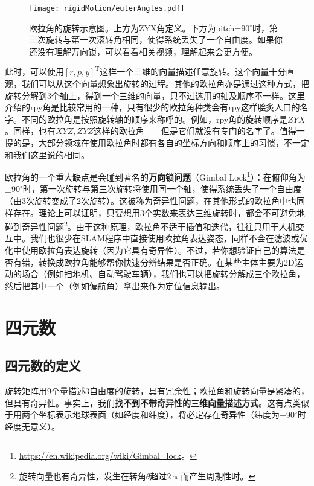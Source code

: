 \begin{figure}[!t]
	\centering
	\texttt{[image: rigidMotion/eulerAngles.pdf]}
	\caption{欧拉角的旋转示意图。上方为ZYX角定义。下方为pitch=$90^\circ$时，第三次旋转与第一次滚转角相同，使得系统丢失了一个自由度。如果你还没有理解万向锁，可以看看相关视频，理解起来会更方便。}
	\label{fig:eulerAngles}
\end{figure}

此时，可以使用$[r,p,y]^\mathrm{T}$这样一个三维的向量描述任意旋转。这个向量十分直观，我们可以从这个向量想象出旋转的过程。其他的欧拉角亦是通过这种方式，把旋转分解到3个轴上，得到一个三维的向量，只不过选用的轴及顺序不一样。这里介绍的rpy角是比较常用的一种，只有很少的欧拉角种类会有rpy这样脍炙人口的名字。不同的欧拉角是按照旋转轴的顺序来称呼的。例如，rpy角的旋转顺序是$ZYX$。同样，也有$XYZ, ZYZ$这样的欧拉角——但是它们就没有专门的名字了。值得一提的是，大部分领域在使用欧拉角时都有各自的坐标方向和顺序上的习惯，不一定和我们这里说的相同。

欧拉角的一个重大缺点是会碰到著名的\textbf{万向锁问题}（Gimbal Lock\footnote{\url{https://en.wikipedia.org/wiki/Gimbal_lock}。}）：在俯仰角为$\pm 90 ^\circ $时，第一次旋转与第三次旋转将使用同一个轴，使得系统丢失了一个自由度（由3次旋转变成了2次旋转）。这被称为奇异性问题，在其他形式的欧拉角中也同样存在。理论上可以证明，只要想用3个实数来表达三维旋转时，都会不可避免地碰到奇异性问题\footnote{旋转向量也有奇异性，发生在转角$\theta$超过$2\uppi$而产生周期性时。}。由于这种原理，欧拉角不适于插值和迭代，往往只用于人机交互中。我们也很少在SLAM程序中直接使用欧拉角表达姿态，同样不会在滤波或优化中使用欧拉角表达旋转（因为它具有奇异性）。不过，若你想验证自己的算法是否有错，转换成欧拉角能够帮你快速分辨结果是否正确。在某些主体主要为2D运动的场合（例如扫地机、自动驾驶车辆），我们也可以把旋转分解成三个欧拉角，然后把其中一个（例如偏航角）拿出来作为定位信息输出。

\section{四元数}
\subsection{四元数的定义}
旋转矩阵用9个量描述3自由度的旋转，具有冗余性；欧拉角和旋转向量是紧凑的，但具有奇异性。事实上，我们\textbf{找不到不带奇异性的三维向量描述方式}\textsuperscript{\cite{Stuelpnagel1964}}。这有点类似于用两个坐标表示地球表面（如经度和纬度），将必定存在奇异性（纬度为$\pm 90^\circ$时经度无意义）。

